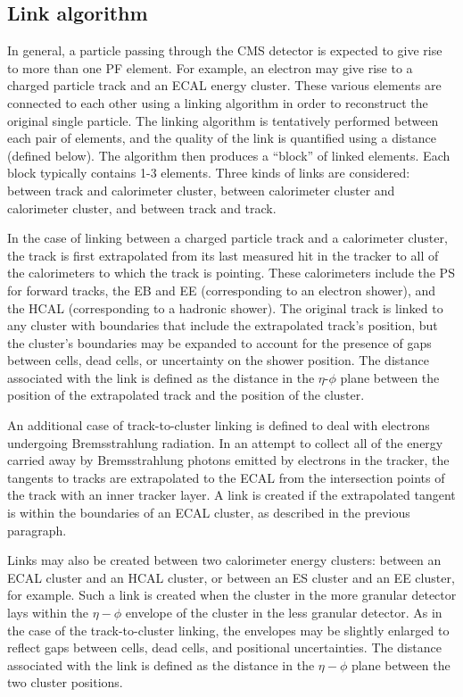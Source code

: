 \subsection{Link algorithm}

In general, a particle passing through the CMS detector
is expected to give rise to more than one PF element.
For example, an electron may give rise to a charged particle
track and an ECAL energy cluster.  These various elements
are connected to each other using a linking algorithm in
order to reconstruct the original single particle.  The linking algorithm
is tentatively performed between each pair of elements, and the 
quality of the link is quantified using a distance (defined below).  The algorithm
then produces a ``block'' of linked elements.  Each block typically
contains 1-3 elements.  Three kinds of links are considered: 
between track and calorimeter cluster, between calorimeter cluster
and calorimeter cluster, and between track and track.

In the case of linking between a charged particle track and a calorimeter cluster,
the track is first extrapolated from its last measured hit in the tracker 
to all of the calorimeters to which the track is pointing.  These calorimeters include 
the PS for forward tracks, the EB and EE (corresponding to an electron shower), and the
HCAL (corresponding to a hadronic shower).  The original track is linked
to any cluster with boundaries that include the extrapolated track's position, but the 
cluster's boundaries may be expanded to account for the presence of gaps between cells,
dead cells, or uncertainty on the shower position.  The distance associated with the
link is defined as the distance in the $\eta$-$\phi$ plane between the 
position of the extrapolated track and the position of the cluster.

An additional case of track-to-cluster linking is defined to deal
with electrons undergoing Bremsstrahlung radiation.  In an attempt
to collect all of the energy carried away by Bremsstrahlung photons
emitted by electrons in the tracker, the tangents to tracks are extrapolated
to the ECAL from the intersection points of the track with an inner 
tracker layer.  A link is created if the extrapolated tangent is within
the boundaries of an ECAL cluster, as described in the previous paragraph.

Links may also be created between two calorimeter energy clusters: between
an ECAL cluster and an HCAL cluster, or between an ES cluster and an EE
cluster, for example.  Such a link is created when the cluster in the more 
granular detector lays within the $\eta-\phi$ envelope of the cluster in the
less granular detector.  As in the case of the track-to-cluster linking,
the envelopes may be slightly enlarged to reflect gaps between cells, dead cells,
and positional uncertainties. The distance associated with the link
is defined as the distance in the $\eta-\phi$ plane between the two cluster
positions.

